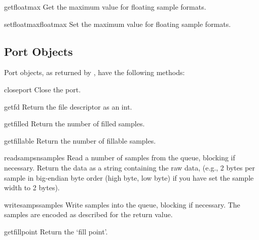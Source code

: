 \begin{methoddesc}{getfloatmax}{}
Get the maximum value for floating sample formats.
\end{methoddesc}

\begin{methoddesc}{setfloatmax}{floatmax}
Set the maximum value for floating sample formats.
\end{methoddesc}


\subsection{Port Objects}
\label{al-port-objects}

Port objects, as returned by , have the following
methods:

\begin{methoddesc}{closeport}{}
Close the port.
\end{methoddesc}

\begin{methoddesc}{getfd}{}
Return the file descriptor as an int.
\end{methoddesc}

\begin{methoddesc}{getfilled}{}
Return the number of filled samples.
\end{methoddesc}

\begin{methoddesc}{getfillable}{}
Return the number of fillable samples.
\end{methoddesc}

\begin{methoddesc}{readsamps}{nsamples}
Read a number of samples from the queue, blocking if necessary.
Return the data as a string containing the raw data, (e.g., 2 bytes per
sample in big-endian byte order (high byte, low byte) if you have set
the sample width to 2 bytes).
\end{methoddesc}

\begin{methoddesc}{writesamps}{samples}
Write samples into the queue, blocking if necessary.  The samples are
encoded as described for the  return value.
\end{methoddesc}

\begin{methoddesc}{getfillpoint}{}
Return the `fill point'.
\end{methoddesc}

